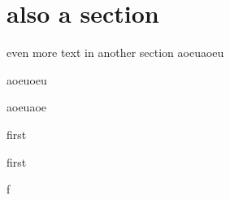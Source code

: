 \section{also a section}
even more text in another section
aoeuaoeu

aoeuoeu \cite{Hansen_2015}

aoeuaoe \cite{Hansen_2011}

first

first

f
